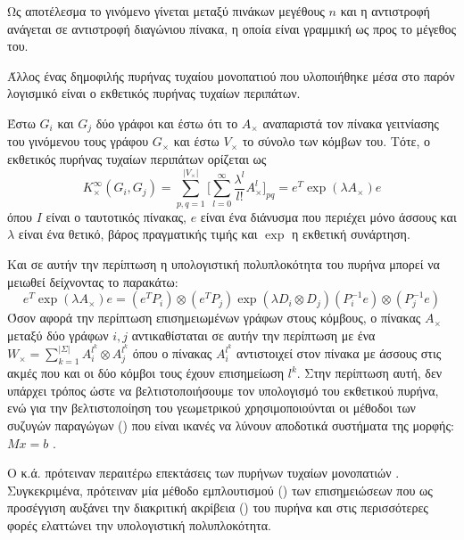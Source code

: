 Ως αποτέλεσμα το γινόμενο  γίνεται μεταξύ πινάκων μεγέθους $n$ και η αντιστροφή ανάγεται σε αντιστροφή διαγώνιου πίνακα, η οποία είναι γραμμική ως προς το μέγεθος του.\par
Άλλος ένας δημοφιλής πυρήνας τυχαίου μονοπατιού που υλοποιήθηκε μέσα στο παρόν λογισμικό είναι ο εκθετικός πυρήνας τυχαίων περιπάτων.
\begin{definition}
	Έστω $G_i$ και $G_j$ δύο γράφοι και έστω ότι το $A_\times$ αναπαριστά τον πίνακα γειτνίασης του γινόμενου τους γράφου $G_\times$ και έστω $V_\times$ το σύνολο των κόμβων του.
	Τότε, ο εκθετικός πυρήνας τυχαίων περιπάτων ορίζεται ως
	\begin{equation}
    	K_{\times}^{\infty}(G_i,G_j) = \sum_{p,q=1}^{|V_{\times}|} \Big[ \sum_{l=0}^{\infty} \frac{\lambda^l}{l!} A_{\times}^l \Big]_{pq} = e^T \exp(\lambda A_{\times}) e
    \end{equation}
	όπου $I$ είναι ο ταυτοτικός πίνακας, $e$ είναι ένα διάνυσμα που περιέχει μόνο άσσους και $\lambda$ είναι ένα θετικό, βάρος πραγματικής τιμής και $\exp$ η εκθετική συνάρτηση.
\end{definition}
Και σε αυτήν την περίπτωση η υπολογιστική πολυπλοκότητα του πυρήνα μπορεί να μειωθεί δείχνοντας το παρακάτω:
\begin{equation}
    e^T\exp(\lambda A_{\times}) e = (e^T P_{i}) \otimes (e^T P_{j})\exp(\lambda D_{i} \otimes D_{j}) (P_{i}^{-1} e) \otimes (P_{j}^{-1} e)
\end{equation}
Όσον αφορά την περίπτωση επισημειωμένων γράφων στους κόμβους, ο πίνακας $Α_{\times}$ μεταξύ δύο γράφων $i, j$ αντικαθίσταται σε αυτήν την περίπτωση με ένα $W_{\times} = \sum_{k=1}^{|\Sigma|}A_{i}^{l^{k}}\otimes A_{j}^{l^{k}}$ όπου ο πίνακας $A_{i}^{l^{k}}$ αντιστοιχεί στον πίνακα με άσσους στις ακμές που και οι δύο κόμβοι τους έχουν επισημείωση $l^{k}$.
Στην περίπτωση αυτή, δεν υπάρχει τρόπος ώστε να βελτιστοποιήσουμε τον υπολογισμό του εκθετικού πυρήνα, ενώ για την βελτιστοποίηση του γεωμετρικού χρησιμοποιούνται οι μέθοδοι των συζυγών παραγώγων () που είναι ικανές να λύνουν αποδοτικά συστήματα της μορφής: $Mx = b$ \cite{cgm}.\par
Ο  κ.ά. πρότειναν περαιτέρω επεκτάσεις των πυρήνων τυχαίων μονοπατιών \cite{mahe2004extensions}.
Συγκεκριμένα, πρότειναν μία μέθοδο εμπλουτισμού () των επισημειώσεων που ως προσέγγιση αυξάνει την διακριτική ακρίβεια () του πυρήνα και στις περισσότερες φορές ελαττώνει την υπολογιστική πολυπλοκότητα.
